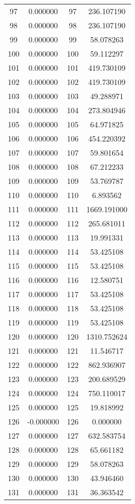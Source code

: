 \documentclass[12pt]{article}
\begin{document}
\begin{longtable}{@{}cccc@{}}
97 & 0.000000 & 97 & 236.107190 \\
98 & 0.000000 & 98 & 236.107190 \\
99 & 0.000000 & 99 & 58.078263 \\
100 & 0.000000 & 100 & 59.112297 \\
101 & 0.000000 & 101 & 419.730109 \\
102 & 0.000000 & 102 & 419.730109 \\
103 & 0.000000 & 103 & 49.288971 \\
104 & 0.000000 & 104 & 273.804946 \\
105 & 0.000000 & 105 & 64.971825 \\
106 & 0.000000 & 106 & 454.220392 \\
107 & 0.000000 & 107 & 59.801654 \\
108 & 0.000000 & 108 & 67.212233 \\
109 & 0.000000 & 109 & 53.769787 \\
110 & 0.000000 & 110 & 6.893562 \\
111 & 0.000000 & 111 & 1669.191000 \\
112 & 0.000000 & 112 & 265.681011 \\
113 & 0.000000 & 113 & 19.991331 \\
114 & 0.000000 & 114 & 53.425108 \\
115 & 0.000000 & 115 & 53.425108 \\
116 & 0.000000 & 116 & 12.580751 \\
117 & 0.000000 & 117 & 53.425108 \\
118 & 0.000000 & 118 & 53.425108 \\
119 & 0.000000 & 119 & 53.425108 \\
120 & 0.000000 & 120 & 1310.752624 \\
121 & 0.000000 & 121 & 11.546717 \\
122 & 0.000000 & 122 & 862.936907 \\
123 & 0.000000 & 123 & 200.689529 \\
124 & 0.000000 & 124 & 750.110017 \\
125 & 0.000000 & 125 & 19.818992 \\
126 & -0.000000 & 126 & 0.000000 \\
127 & 0.000000 & 127 & 632.583754 \\
128 & 0.000000 & 128 & 65.661182 \\
129 & 0.000000 & 129 & 58.078263 \\
130 & 0.000000 & 130 & 43.946460 \\
131 & 0.000000 & 131 & 36.363542 \\

\end{longtable}
\end{document}

